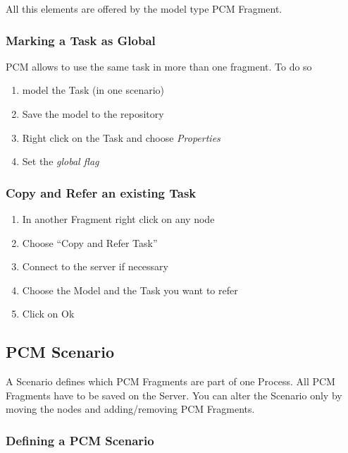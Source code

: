 \documentclass{acm_proc_article-sp}
\begin{document}
All this elements are offered by the model type PCM Fragment.

%
%
\subsubsection{Marking a Task as Global}\label{marking-a-task-as-global}
PCM allows to use the same task in more than one fragment. To do so

\begin{enumerate}
\def\labelenumi{\arabic{enumi}.}
\itemsep1pt\parskip0pt
\item
  model the Task (in one scenario)
\item
  Save the model to the repository
\item
  Right click on the Task and choose \emph{Properties}
\item
  Set the \emph{global flag}
\end{enumerate}

%
%
\subsubsection{Copy and Refer an existing
Task}\label{copy-and-refer-an-existing-task}

\begin{enumerate}
\def\labelenumi{\arabic{enumi}.}
\itemsep1pt\parskip0pt
\item
  In another Fragment right click on any node
\item
  Choose ``Copy and Refer Task''
\item
  Connect to the server if necessary
\item
  Choose the Model and the Task you want to refer
\item
  Click on Ok
\end{enumerate}

%
%
\subsection{PCM Scenario}\label{pcm-scenario}
A Scenario defines which PCM Fragments are part of one Process. All PCM
Fragments have to be saved on the Server. You can alter the Scenario
only by moving the nodes and adding/removing PCM Fragments.

%
%
\subsubsection{Defining a PCM Scenario}\label{defining-a-pcm-scenario}
\end{document}
